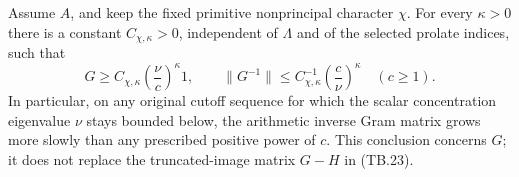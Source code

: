 \begin{theorem}
\label{AC-T28}
Assume \(A\), and keep the fixed primitive nonprincipal
character \(\chi\).  For every \(\kappa>0\) there is a constant
\(C_{\chi,\kappa}>0\), independent of \(\Lambda\) and of the
selected prolate indices, such that
\[
       G\geq C_{\chi,\kappa}\left(\frac{\nu}{c}\right)^\kappa 1,
       \qquad
       \|G^{-1}\|\leq
              C_{\chi,\kappa}^{-1}\left(\frac c\nu\right)^\kappa
       \quad(c\geq1).
 \tag{TB.31}
\]
In particular, on any original cutoff sequence for which
the scalar concentration eigenvalue \(\nu\) stays bounded
below, the arithmetic inverse Gram matrix grows more slowly
than any prescribed positive power of \(c\).
This conclusion concerns \(G\); it does not replace the
truncated-image matrix \(G-H\) in (TB.23).
\end{theorem}
